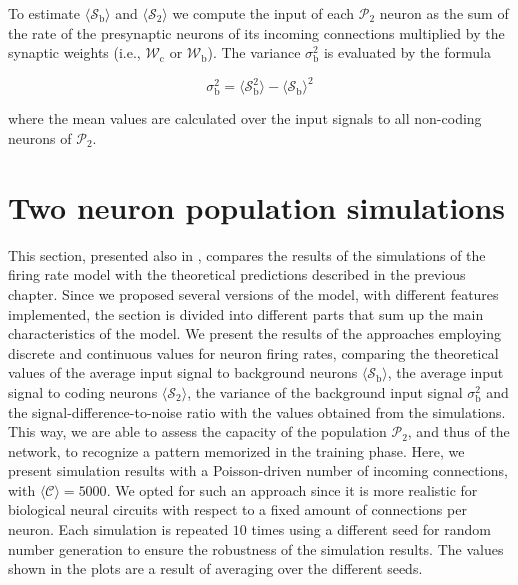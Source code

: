 \documentclass[a4paper, 12pt, twoside, openright]{book}
\newcommand{\popII}{\mathcal{P}_2}
\newcommand{\C}{\mathcal{C}}
\newcommand{\Wb}{\mathcal{W}_\text{b}}
\newcommand{\Wc}{\mathcal{W}_\text{c}}
\newcommand{\SII}{\mathcal{S}_\text{2}}
\newcommand{\Sb}{\mathcal{S}_\text{b}}
\newcommand{\varSb}{\sigma^{2}_\text{b}}
\begin{document}
To estimate $\langle\Sb\rangle$ and $\langle\SII\rangle$ we compute the input of each $\popII$ neuron as the sum of the rate of the presynaptic neurons of its incoming connections multiplied by the synaptic weights (i.e., $\Wc$ or $\Wb$). 
The variance $\varSb$ is evaluated by the formula

\begin{equation}
    \varSb = \langle\Sb^2\rangle - \langle\Sb\rangle^2
\end{equation}

where the mean values are calculated over the input signals to all non-coding neurons of $\popII$.

\section{Two neuron population simulations}
This section, presented also in \cite{Tiddia2023}, compares the results of the simulations of the firing rate model with the theoretical predictions described in the previous chapter. Since we proposed several versions of the model, with different features implemented, the section is divided into different parts that sum up the main characteristics of the model.
We present the results of the approaches employing discrete and continuous values for neuron firing rates, comparing the theoretical values of the average input signal to background neurons $\langle\Sb\rangle$, the average input signal to coding neurons $\langle\SII\rangle$, the variance of the background input signal $\varSb$ and the signal-difference-to-noise ratio with the values obtained from the simulations.
This way, we are able to assess the capacity of the population $\popII$, and thus of the network, to recognize a pattern memorized in the training phase.
Here, we present simulation results with a Poisson-driven number of incoming connections, with $\langle\C\rangle=5000$. We opted for such an approach since it is more realistic for biological neural circuits with respect to a fixed amount of connections per neuron. Each simulation is repeated $10$ times using a different seed for random number generation to ensure the robustness of the simulation results. The values shown in the plots are a result of averaging over the different seeds.
\end{document}
